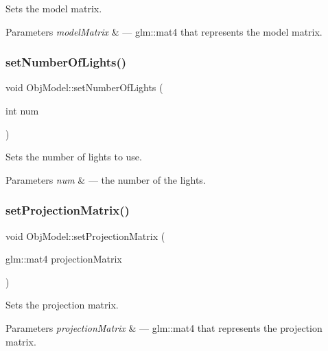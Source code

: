 Sets the model matrix. 


\begin{DoxyParams}{Parameters}
{\em model\+Matrix} & --- glm\+::mat4 that represents the model matrix. \\
\hline
\end{DoxyParams}
\mbox{\label{class_obj_model_a99417a3c2103544059483d601959bf35}} 
\subsubsection{\texorpdfstring{set\+Number\+Of\+Lights()}{setNumberOfLights()}}
{\footnotesize\ttfamily void Obj\+Model\+::set\+Number\+Of\+Lights (\begin{DoxyParamCaption}\item[{int}]{num }\end{DoxyParamCaption})}



Sets the number of lights to use. 


\begin{DoxyParams}{Parameters}
{\em num} & --- the number of the lights. \\
\hline
\end{DoxyParams}
\mbox{\label{class_obj_model_ad446f9410a25203f013f8f72d5cd4838}} 
\subsubsection{\texorpdfstring{set\+Projection\+Matrix()}{setProjectionMatrix()}}
{\footnotesize\ttfamily void Obj\+Model\+::set\+Projection\+Matrix (\begin{DoxyParamCaption}\item[{glm\+::mat4}]{projection\+Matrix }\end{DoxyParamCaption})}



Sets the projection matrix. 


\begin{DoxyParams}{Parameters}
{\em projection\+Matrix} & --- glm\+::mat4 that represents the projection matrix. \\
\hline
\end{DoxyParams}
\mbox{\label{class_obj_model_ae31ffd11ef840ac59f9d622f520d7797}} 
